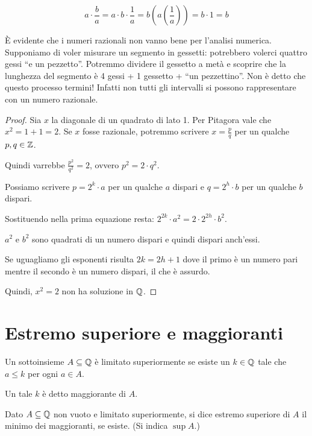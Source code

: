 \begin{equation*}
a \cdot \frac{b}{a} = a \cdot b \cdot \frac{1}{a} = b (a(\frac{1}{a})) = b \cdot 1 = b
\end{equation*}

È evidente che i numeri razionali non vanno bene per l'analisi numerica. Supponiamo di voler misurare un segmento in gessetti: potrebbero volerci quattro gessi ``e un pezzetto''. Potremmo dividere il gessetto a metà e scoprire che la lunghezza del segmento è 4 gessi + 1 gessetto + ``un pezzettino''. Non è detto che questo processo termini! Infatti non tutti gli intervalli si possono rappresentare con un numero razionale.  

\begin{proof}
Sia $x$ la diagonale di un quadrato di lato 1. Per Pitagora vale che $x^2 = 1 + 1 = 2$. Se $x$ fosse razionale, potremmo scrivere $x = \frac{p}{q}$ per un qualche $p,q \in \mathbb Z$. 

Quindi varrebbe $\frac{p^2}{q^2} = 2$, ovvero $p^2 = 2\cdot q^2$.

Possiamo scrivere $p = 2^k \cdot a$ per un qualche $a$ dispari e $q = 2^h \cdot b$ per un qualche $b$ dispari.

Sostituendo nella prima equazione resta: $2^{2k} \cdot a^2 = 2 \cdot 2^{2h} \cdot b^2$.

$a^2$ e $b^2$ sono quadrati di un numero dispari e quindi dispari anch'essi.

Se uguagliamo gli esponenti risulta $2k = 2h + 1$ dove il primo è un numero pari mentre il secondo è un numero dispari, il che è assurdo.

Quindi, $x^2 = 2$ non ha soluzione in $\mathbb Q$.
\end{proof}

\section{Estremo superiore e maggioranti}

\begin{definition}
Un sottoinsieme $A \subseteq \mathbb Q$ è limitato superiormente se esiste un $k \in \mathbb Q$ tale che $a \le k$ per ogni $a \in A$. 

Un tale $k$ è detto maggiorante di $A$.
\end{definition}

\begin{definition}
Dato $A \subseteq \mathbb Q$ non vuoto e limitato superiormente, si dice estremo superiore di $A$ il minimo dei maggioranti, se esiste. (Si indica $\sup A$.)
\end{definition}

